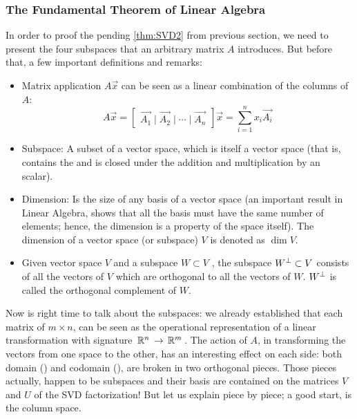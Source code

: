 \subsubsection{The Fundamental Theorem of Linear Algebra}

In order to proof the pending \cref{thm:SVD2} from previous
section, we need to present the four subspaces that an arbitrary
matrix $A$ introduces. But before that, a few important
definitions and remarks: \\

\begin{itemize}
    \item Matrix application $A\vec{x}$ can be seen as a linear
      combination of the columns of $A$:
      \[
      A\vec{x} = 
      \begin{bmatrix}
        \vec{A_1} \mid \vec{A_2} \mid \cdots \mid \vec{A_n}
      \end{bmatrix} \vec{x} = 
      \sum_{i=1}^n x_i \vec{A_i}
      \]
  \item Subspace: A subset of a vector space, which is itself a
    vector space (that is, contains the  and is closed under
    the addition and multiplication by an scalar). 
  \item Dimension: Is the size of any basis of a vector space (an
    important result in Linear Algebra, shows that all the basis must
    have the same number of elements; hence, the dimension is a property of the
    space itself). The dimension of a vector space (or subspace) $V$
    is denoted as $\dim{V}$.
  \item Given vector space $V$ and a subspace $W \subset V$ , the
    subspace ${W}^{\bot} \subset V$ consists of all
    the vectors of $V$ which are orthogonal to all the vectors of
    $W$. ${W}^{\bot}$ is called the orthogonal complement of $W$.
\end{itemize}
\hfill

Now is right time to talk about the subspaces: we already established
that each matrix of $m \times n$, can be seen as the operational
representation of a linear transformation with signature $\,\mathbb{R}^{n}\,
\rightarrow \,\mathbb{R}^{m}\,$. The action of $A$, in transforming the vectors from
one space to the other, has an interesting effect on each side: both
domain () and codomain (), are broken in two orthogonal
pieces. Those pieces actually, happen to be subspaces and their basis
are contained on the matrices $V$ and $U$ of the SVD factorization! But
let us explain piece by piece; a good start, is the column space. \\

